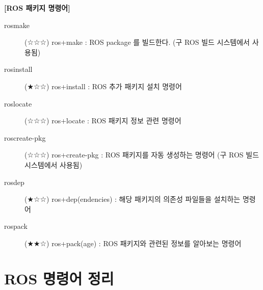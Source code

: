 \vspace{\baselineskip}
\noindent
\textbf{[ROS 패키지 명령어]}
\begin{description}
\item[rosmake] (☆☆☆) ros+make : ROS package 를 빌드한다. (구 ROS 빌드 시스템에서 사용됨)
\item[rosinstall] (★☆☆) ros+install : ROS 추가 패키지 설치 명령어
\item[roslocate] (☆☆☆) ros+locate : ROS 패키지 정보 관련 명령어 
\item[roscreate-pkg] (☆☆☆) ros+create-pkg : ROS 패키지를 자동 생성하는 명령어 (구 ROS 빌드 시스템에서 사용됨)
\item[rosdep] (★☆☆) ros+dep(endencies) : 해당 패키지의 의존성 파일들을 설치하는 명령어
\item[rospack] (★★☆) ros+pack(age) : ROS 패키지와 관련된 정보를 알아보는 명령어
\end{description}

\section{ROS 명령어 정리}

































































